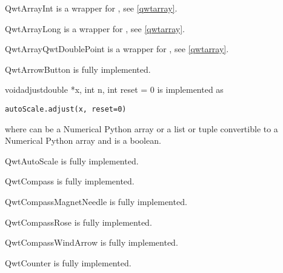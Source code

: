\documentclass{manual}
\begin{document}
\begin{classdesc*}{QwtArrayInt}
  is a wrapper for , see \ref{qwtarray}.
\end{classdesc*}

\begin{classdesc*}{QwtArrayLong}
  is a wrapper for , see \ref{qwtarray}.
\end{classdesc*}

\begin{classdesc*}{QwtArrayQwtDoublePoint}
  is a wrapper for , see \ref{qwtarray}.
\end{classdesc*}

\begin{classdesc*}{QwtArrowButton}
  is fully implemented.

  \begin{cfuncdesc}{void}{adjust}{double *x, int n, int reset = 0}
    is implemented as
    \begin{verbatim}
autoScale.adjust(x, reset=0)
    \end{verbatim}
    where  can be a Numerical Python array or a list or tuple
    convertible to a Numerical Python array and  is a boolean.
  \end{cfuncdesc}

\end{classdesc*}

\begin{classdesc*}{QwtAutoScale}
  is fully implemented.
\end{classdesc*}

\begin{classdesc*}{QwtCompass}
  is fully implemented.
\end{classdesc*}

\begin{classdesc*}{QwtCompassMagnetNeedle}
  is fully implemented.
\end{classdesc*}

\begin{classdesc*}{QwtCompassRose}
  is fully implemented.
\end{classdesc*}

\begin{classdesc*}{QwtCompassWindArrow}
  is fully implemented.
\end{classdesc*}

\begin{classdesc*}{QwtCounter}
  is fully implemented.
\end{classdesc*}
\end{document}
